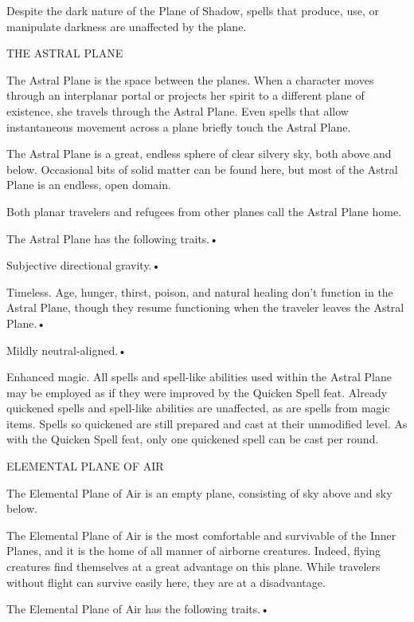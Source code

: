 \documentclass{article}
\begin{document}
\parindent=0pt
Despite the dark nature of the Plane of Shadow, spells that produce, use, or manipulate 
darkness are unaffected by the plane.

\vspace{12pt}
THE ASTRAL PLANE

The Astral Plane is the space between the planes. When a character moves through 
an interplanar portal or projects her spirit to a different plane of existence, 
she travels through the Astral Plane. Even spells that allow instantaneous movement 
across a plane\textit{ }briefly touch the Astral Plane.

The Astral Plane is a great, endless sphere of clear silvery sky, both above and 
below. Occasional bits of solid matter can be found here, but most of the Astral 
Plane is an endless, open domain.

Both planar travelers and refugees from other planes call the Astral Plane home. 

The Astral Plane has the following traits.• 

\parindent=3pt
Subjective directional gravity.• 

Timeless. Age, hunger, thirst, poison, and natural healing don't function in the 
Astral Plane, though they resume functioning when the traveler leaves the Astral 
Plane.• 

\parindent=7pt
Mildly neutral-aligned.• 

\parindent=3pt
Enhanced magic. All spells and spell-like abilities used within the Astral Plane 
may be employed as if they were improved by the Quicken Spell feat. Already quickened 
spells and spell-like abilities are unaffected, as are spells from magic items. 
Spells so quickened are still prepared and cast at their unmodified level. As with 
the Quicken Spell feat, only one quickened spell can be cast per round.

\vspace{12pt}
\parindent=0pt
ELEMENTAL PLANE OF AIR

The Elemental Plane of Air is an empty plane, consisting of sky above and sky below.

The Elemental Plane of Air is the most comfortable and survivable of the Inner 
Planes, and it is the home of all manner of airborne creatures. Indeed, flying 
creatures find themselves at a great advantage on this plane. While travelers without 
flight can survive easily here, they are at a disadvantage.

The Elemental Plane of Air has the following traits.• 
\end{document}
